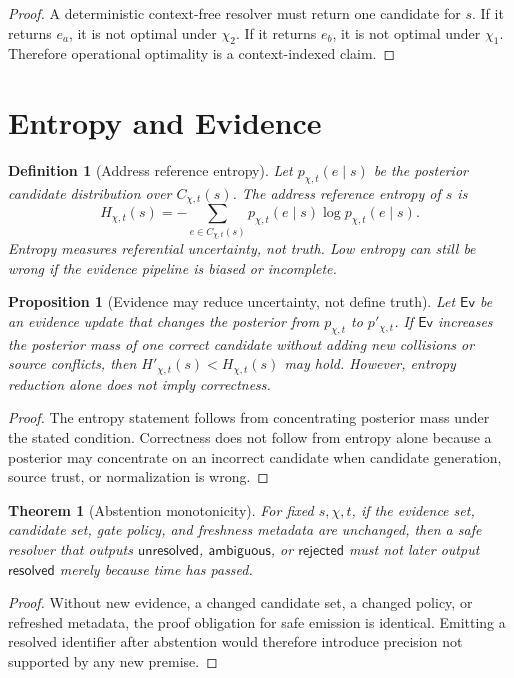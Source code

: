 \documentclass[11pt]{article}
\newtheorem{definition}{Definition}
\newtheorem{theorem}{Theorem}
\newtheorem{proposition}{Proposition}
\newcommand{\Resolved}{\mathsf{resolved}}
\newcommand{\Ambiguous}{\mathsf{ambiguous}}
\newcommand{\Unresolved}{\mathsf{unresolved}}
\newcommand{\Rejected}{\mathsf{rejected}}
\newcommand{\Evidence}{\mathsf{Ev}}
\begin{document}
\begin{proof}
A deterministic context-free resolver must return one candidate for \(s\). If
it returns \(e_a\), it is not optimal under \(\chi_2\). If it returns \(e_b\),
it is not optimal under \(\chi_1\). Therefore operational optimality is a
context-indexed claim.
\end{proof}

\section{Entropy and Evidence}

\begin{definition}[Address reference entropy]
Let \(p_{\chi,t}(e\mid s)\) be the posterior candidate distribution over
\(C_{\chi,t}(s)\). The address reference entropy of \(s\) is
\[
H_{\chi,t}(s)
  =
  -\sum_{e\in C_{\chi,t}(s)}
    p_{\chi,t}(e\mid s)\log p_{\chi,t}(e\mid s).
\]
Entropy measures referential uncertainty, not truth. Low entropy can still be
wrong if the evidence pipeline is biased or incomplete.
\end{definition}

\begin{proposition}[Evidence may reduce uncertainty, not define truth]
Let \(\Evidence\) be an evidence update that changes the posterior from
\(p_{\chi,t}\) to \(p'_{\chi,t}\). If \(\Evidence\) increases the posterior mass
of one correct candidate without adding new collisions or source conflicts,
then \(H'_{\chi,t}(s) < H_{\chi,t}(s)\) may hold. However, entropy reduction
alone does not imply correctness.
\end{proposition}

\begin{proof}
The entropy statement follows from concentrating posterior mass under the
stated condition. Correctness does not follow from entropy alone because a
posterior may concentrate on an incorrect candidate when candidate generation,
source trust, or normalization is wrong.
\end{proof}

\begin{theorem}[Abstention monotonicity]
For fixed \(s,\chi,t\), if the evidence set, candidate set, gate policy, and
freshness metadata are unchanged, then a safe resolver that outputs
\(\Unresolved\), \(\Ambiguous\), or \(\Rejected\) must not later output
\(\Resolved\) merely because time has passed.
\end{theorem}

\begin{proof}
Without new evidence, a changed candidate set, a changed policy, or refreshed
metadata, the proof obligation for safe emission is identical. Emitting a
resolved identifier after abstention would therefore introduce precision not
supported by any new premise.
\end{proof}
\end{document}
